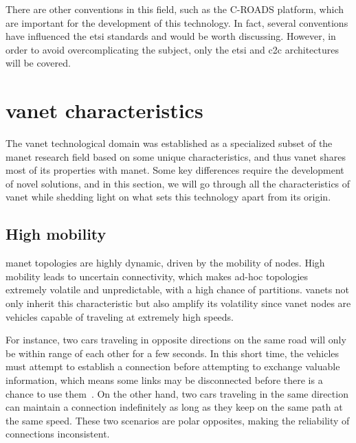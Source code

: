 There are other conventions in this field, such as the C-ROADS platform, which are important for the development of this technology. In fact, several conventions have influenced the \gls{etsi} standards and would be worth discussing. However, in order to avoid overcomplicating the subject, only the \gls{etsi} and \gls{c2c} architectures will be covered.




\section[VANET characteristics]{\gls{vanet} characteristics}
\label{sec:VANET_characteristics}

The \gls{vanet} technological domain was established as a specialized subset of the \gls{manet} research field based on some unique characteristics, and thus \gls{vanet} shares most of its properties with \gls{manet}. Some key differences require the development of novel solutions, and in this section, we will go through all the characteristics of \gls{vanet} while shedding light on what sets this technology apart from its origin.

\subsection{High mobility}
\label{subsec:high_mob}

\gls{manet} topologies are highly dynamic, driven by the mobility of nodes. High mobility leads to uncertain connectivity, which makes ad-hoc topologies extremely volatile and unpredictable, with a high chance of partitions\cite{toor_vehicle_2008}. \glspl{vanet} not only inherit this characteristic but also amplify its volatility since \gls{vanet} nodes are vehicles capable of traveling at extremely high speeds. 

For instance, two cars traveling in opposite directions on the same road will only be within range of each other for a few seconds. In this short time, the vehicles must attempt to establish a connection before attempting to exchange valuable information, which means some links may be disconnected before there is a chance to use them~\cite{liang_vehicular_2015}. On the other hand, two cars traveling in the same direction can maintain a connection indefinitely as long as they keep on the same path at the same speed. These two scenarios are polar opposites, making the reliability of connections inconsistent.

